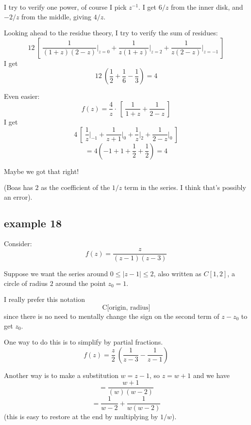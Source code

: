 \documentclass[11pt, oneside]{article}
\begin{document}
I try to verify one power, of course I pick $z^{-1}$.  I get $6/z$ from the inner disk, and $-2/z$ from the middle, giving $4/z$.

Looking ahead to the residue theory, I try to verify the sum of residues:
\[ 12 \ [ \ \frac{1}{(1+z)(2-z)} \bigg |_{z=0} + \frac{1}{z(1+z)} \bigg |_{z=2} + \frac{1}{z(2-z)} \bigg |_{z=-1} \ ] \]
I get
\[ 12 \ (\frac{1}{2} + \frac{1}{6} - \frac{1}{3} ) = 4 \]

Even easier:
\[ f(z) = \frac{4}{z} \cdot \ [ \ \frac{1}{1 + z} + \frac{1}{2 - z} \ ]\]
I get
\[ 4 \ [ \ \frac{1}{z} \bigg |_{-1} + \frac{1}{z+1} \bigg |_{0} + \frac{1}{z} \bigg |_{2} + \frac{1}{2-z} \bigg |_{0} \ ] \]
\[ = 4(-1 + 1 + \frac{1}{2} + \frac{1}{2}) = 4 \]

Maybe we got that right!

(Boas has $2$ as the coefficient of the $1/z$ term in the series.  I think that's possibly an error).

\subsection*{example 18}

\label{sec:ex18L}

Consider:
\[ f(z) = \frac{z}{(z-1)(z-3)} \]

Suppose we want the series around $0 \le | z - 1 | \le 2$, also written as $C[1,2]$, a circle of radius $2$ around the point $z_0 = 1$.

I really prefer this notation
\[ \text{C[origin, radius]} \]
since there is no need to mentally change the sign on the second term of $z - z_0$ to get $z_0$.

One way to do this is to simplify by partial fractions.
\[ f(z) = \frac{z}{2} \ (\frac{1}{z - 3} - \frac{1}{z - 1}) \]

Another way is to make a substitution $w = z - 1$, so $z = w + 1$ and we have
\[  = \frac{w+1}{(w)(w-2)} \]
\[ = \frac{1}{w - 2} + \frac{1}{w(w-2)}  \]
(this is easy to restore at the end by multiplying by $1/w$).
\end{document}
